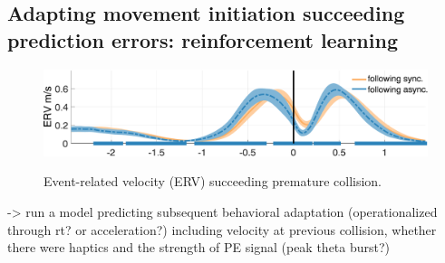 \subsection{Adapting movement initiation succeeding prediction errors: reinforcement learning}

\begin{figure}[h]
  \includegraphics[width=\textwidth]{figures/vel_post_async.pdf}
  \label{vel_erp_post_mismatch}
  \caption{Event-related velocity (ERV) succeeding premature collision.}
\end{figure}

-> run a model predicting subsequent behavioral adaptation (operationalized through rt? or acceleration?) including velocity at previous collision, whether there were haptics and the strength of PE signal (peak theta burst?)


